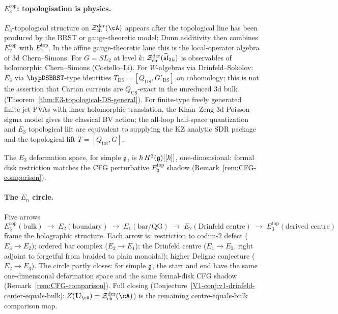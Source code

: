 \paragraph{$E_3^{\mathrm{top}}$: topologisation is physics.}
$E_3$-topological structure on
$\cZ^{\mathrm{der}}_{\mathrm{ch}}(\cA)$ appears after the
topological line has been produced by the BRST or gauge-theoretic
model; Dunn additivity then combines
$E_2^{\mathrm{top}}$ with $E_1^{\mathrm{top}}$. In the affine
gauge-theoretic lane this is the local-operator algebra of 3d
Chern--Simons. For $G = SL_2$ at level $k$:
$\mathcal{Z}^{\mathrm{der}}_{\mathrm{ch}}(\widehat{\mathfrak{sl}}_2{}_k)$
is observables of holomorphic Chern--Simons (Costello--Li). For
$W$-algebras via Drinfeld--Sokolov: $E_3$ via
\(\hypDSBRST\)-type identities
$T_{\mathrm{DS}} = [Q_{\mathrm{DS}}, G'_{\mathrm{DS}}]$ on
cohomology; this is not the assertion that Cartan currents are
\(Q_{\mathrm{CS}}\)-exact in the unreduced 3d bulk
(Theorem~\ref{thm:E3-topological-DS-general}). For finite-type
freely generated finite-jet PVAs with inner holomorphic translation,
the Khan--Zeng 3d Poisson sigma model gives the classical BV action;
the all-loop half-space quantization and $E_3$ topological lift are
equivalent to supplying the KZ analytic SDR package and the
topological lift $T=[Q_{\mathrm{tot}},G]$.

The $E_3$ deformation space, for simple $\mathfrak{g}$, is
$\hbar\,H^3(\mathfrak{g})[[\hbar]]$, one-dimensional: formal disk
restriction matches the CFG perturbative $E_3^{\mathrm{top}}$
shadow (Remark~\ref{rem:CFG-comparison}).

\paragraph{The $E_n$ circle.}
Five arrows
\[
E_3^{\mathrm{top}}(\text{bulk})
\;\to\;
E_2(\text{boundary})
\;\to\;
E_1(\text{bar/QG})
\;\to\;
E_2(\text{Drinfeld centre})
\;\to\;
E_3^{\mathrm{top}}(\text{derived centre})
\]
frame the holographic structure. Each arrow is: restriction to
codim-$2$ defect ($E_3 \to E_2$); ordered bar complex
($E_2 \to E_1$); the Drinfeld centre ($E_1 \to E_2$, right
adjoint to forgetful from braided to plain monoidal); higher
Deligne conjecture ($E_2 \to E_3$). The circle partly closes:
for simple $\mathfrak{g}$, the start and end have the same one-dimensional
deformation space and the same formal-disk CFG shadow
(Remark~\ref{rem:CFG-comparison}). Full closing
(Conjecture~\ref{V1-conj:v1-drinfeld-center-equals-bulk}:
$Z(\mathbf{U}_\cA) = \cZ^{\mathrm{der}}_{\mathrm{ch}}(\cA)$)
is the remaining centre-equals-bulk comparison map.

